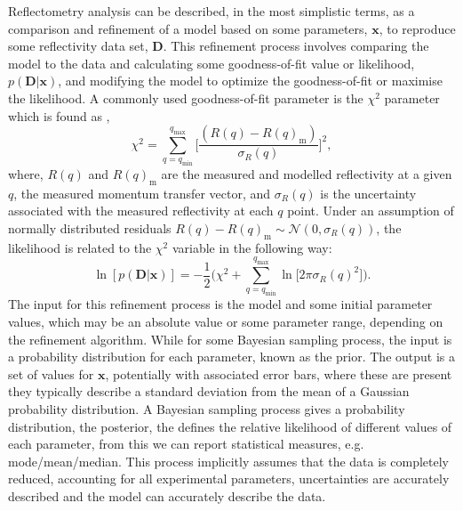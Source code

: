 \documentclass[reprint,superscriptaddress,aps,amsmath,linenumbers]{revtex4-2}
\begin{document}
Reflectometry analysis can be described, in the most simplistic terms, as a comparison and refinement of a model based on some parameters, $\mathbf{x}$, to reproduce some reflectivity data set, $\mathbf{D}$. 
This refinement process involves comparing the model to the data and calculating some goodness-of-fit value or likelihood, $p(\mathbf{D} | \mathbf{x})$, and modifying the model to optimize the goodness-of-fit or maximise the likelihood.
A commonly used goodness-of-fit parameter is the $\chi^2$ parameter which is found as \cite{nelson_refnx_2019}, 
%
\begin{equation}
    \chi^2 = \sum_{q=q_{\text{min}}}^{q_{\text{max}}}{\bigg[\frac{(R(q) - R(q)_{\text{m}})}{\sigma_R(q)}\bigg]^2}, 
\end{equation}
%
where, $R(q)$ and $R(q)_{\text{m}}$ are the measured and modelled reflectivity at a given $q$, the measured momentum transfer vector, and $\sigma_R(q)$ is the uncertainty associated with the measured reflectivity at each $q$ point. 
Under an assumption of normally distributed residuals $R(q) - R(q)_{\text{m}} \sim \mathcal{N}(0, \sigma_R(q))$, the likelihood is related to the $\chi^2$ variable in the following way:
%
\begin{equation}
    \ln[p(\mathbf{D} | \mathbf{x})] = -\frac{1}{2} \bigg(\chi^2 + \sum_{q=q_{\text{min}}}^{q_{\text{max}}}\ln{\big[2\pi\sigma_R(q)^2\big]}\bigg).
    \label{equ:likelihood}
\end{equation}
%
The input for this refinement process is the model and some initial parameter values, which may be an absolute value or some parameter range, depending on the refinement algorithm.
While for some Bayesian sampling process, the input is a probability distribution for each parameter, known as the prior.
The output is a set of values for $\mathbf{x}$, potentially with associated error bars, where these are present they typically describe a standard deviation from the mean of a Gaussian probability distribution. 
A Bayesian sampling process gives a probability distribution, the posterior, the defines the relative likelihood of different values of each parameter, from this we can report statistical measures, e.g. mode/mean/median.
This process implicitly assumes that the data is completely reduced, accounting for all experimental parameters, uncertainties are accurately described and the model can accurately describe the data. 
\end{document}
